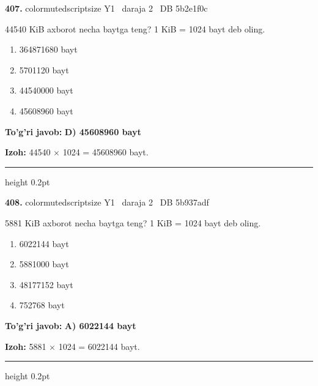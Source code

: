 \documentclass[10pt,a4paper,oneside]{article}
\begin{document}
\noindent\textbf{\color{ink}407.}  {color{muted}scriptsize Y1 \textbullet\ daraja 2 \textbullet\ DB 5b2e1f0c}
\par
44540 KiB axborot necha baytga teng? 1 KiB = 1024 bayt deb oling.
\begin{enumerate}[label=\Alph*),leftmargin=9mm]
\item 364871680 bayt
\item 5701120 bayt
\item 44540000 bayt
\item 45608960 bayt
\end{enumerate}
\begin{tcolorbox}[enhanced,breakable,colback=teal!4,colframe=teal!50!black,boxrule=0.5pt,arc=1.1mm,left=3mm,right=3mm,top=1.7mm,bottom=1.7mm,before skip=2mm,after skip=2mm]
\textbf{\color{teal}To'g'ri javob:} \textbf{D) 45608960 bayt}
\par\smallskip
\textbf{Izoh:} 44540 \ensuremath{\times} 1024 = 45608960 bayt.
\end{tcolorbox}
\vspace{2mm}\hrule height 0.2pt \vspace{3mm}

\noindent\textbf{\color{ink}408.}  {color{muted}scriptsize Y1 \textbullet\ daraja 2 \textbullet\ DB 5b937adf}
\par
5881 KiB axborot necha baytga teng? 1 KiB = 1024 bayt deb oling.
\begin{enumerate}[label=\Alph*),leftmargin=9mm]
\item 6022144 bayt
\item 5881000 bayt
\item 48177152 bayt
\item 752768 bayt
\end{enumerate}
\begin{tcolorbox}[enhanced,breakable,colback=teal!4,colframe=teal!50!black,boxrule=0.5pt,arc=1.1mm,left=3mm,right=3mm,top=1.7mm,bottom=1.7mm,before skip=2mm,after skip=2mm]
\textbf{\color{teal}To'g'ri javob:} \textbf{A) 6022144 bayt}
\par\smallskip
\textbf{Izoh:} 5881 \ensuremath{\times} 1024 = 6022144 bayt.
\end{tcolorbox}
\vspace{2mm}\hrule height 0.2pt \vspace{3mm}
\end{document}
